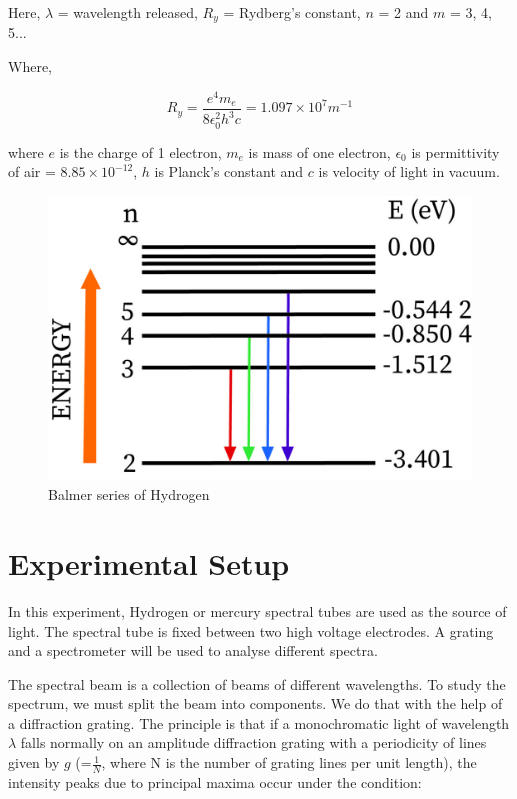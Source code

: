 Here, $\lambda$ = wavelength released, $R_y$ = Rydberg’s constant, $n$ = 2 and $m$ = 3, 4, 5...

\vspace{5mm}

Where,

$$R_y = \frac{e^4m_e}{8\epsilon_0^2h^3c} = 1.097 \times 10^7 m^{-1}$$

where $e$ is the charge of 1 electron, $m_e$ is mass of one electron, $\epsilon_0$ is permittivity of air = $8.85 \times 10^{-12}$, $h$ is Planck's constant and $c$ is velocity of light in vacuum.



\begin{figure}[H]
    \centering
    \includegraphics[width=.6\columnwidth]{images/Balmer-Series.jpg}
    \caption{Balmer series of Hydrogen}
    \label{fig:1}
\end{figure}
\section{Experimental Setup}

In this experiment, Hydrogen or mercury spectral tubes are used
as the source of light. The spectral tube is
fixed between two high voltage electrodes.
A grating and a spectrometer will be used to
analyse different spectra. 

The spectral beam is a collection of beams of different wavelengths. To study the spectrum, we must split the beam into components. We do that with the help of a diffraction grating. The principle is that if a monochromatic light of wavelength $\lambda$ falls normally on an amplitude diffraction grating with a periodicity of lines given by $g$ (=$\frac{1}{N}$, where N is the number of grating lines per unit length), the intensity peaks due to principal maxima occur under the condition:


